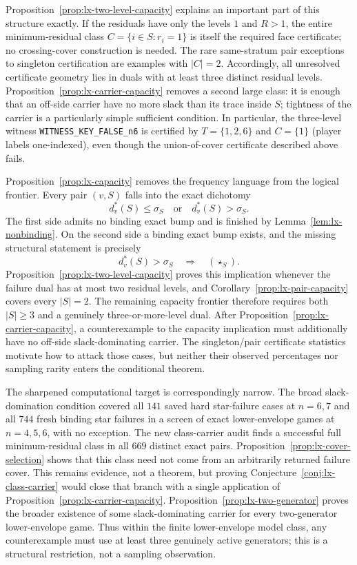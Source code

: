 Proposition~\ref{prop:lx-two-level-capacity} explains an important part of
this structure exactly.  If the residuals have only the levels $1$ and
$R>1$, the entire minimum-residual class
$C=\{i\in S:r_i=1\}$ is itself the required face certificate; no
crossing-cover construction is needed.  The rare same-stratum pair exceptions
to singleton certification are examples with $|C|=2$.  Accordingly, all
unresolved certificate geometry lies in duals with at least three distinct
residual levels.  Proposition~\ref{prop:lx-carrier-capacity} removes a second
large class: it is enough that an off-side carrier have no more slack than its
trace inside $S$; tightness of the carrier is a particularly simple sufficient
condition.  In particular, the
three-level witness \texttt{WITNESS\_KEY\_FALSE\_n6} is certified by
$T=\{1,2,6\}$ and $C=\{1\}$ (player labels one-indexed), even though the
union-of-cover certificate described above fails.

Proposition~\ref{prop:lx-capacity} removes the frequency language from the
logical frontier. Every pair $(v,S)$ falls into the exact dichotomy
\[
 d^*_v(S)\leq\sigma_S
 \quad\text{or}\quad
 d^*_v(S)>\sigma_S.
\]
The first side admits no binding exact bump and is finished by
Lemma~\ref{lem:lx-nonbinding}. On the second side a binding exact bump exists,
and the missing structural statement is precisely
\[
 d^*_v(S)>\sigma_S\quad\Longrightarrow\quad(\star_S).
\]
Proposition~\ref{prop:lx-two-level-capacity} proves this implication whenever
the failure dual has at most two residual levels, and
Corollary~\ref{prop:lx-pair-capacity} covers every $|S|=2$.  The remaining
capacity frontier therefore requires both $|S|\geq3$ and a genuinely
three-or-more-level dual.  After
Proposition~\ref{prop:lx-carrier-capacity}, a counterexample to the capacity
implication must additionally have no off-side slack-dominating carrier.  The
singleton/pair certificate statistics motivate how to attack those cases, but
neither their observed percentages nor sampling rarity enters the conditional
theorem.

The sharpened computational target is correspondingly narrow.  The broad
slack-domination condition covered all $141$ saved hard star-failure cases at
$n=6,7$ and all $744$ fresh binding star failures in a screen of exact
lower-envelope games at $n=4,5,6$, with no exception.  The new class-carrier
audit finds a successful full minimum-residual class in all $669$ distinct
exact pairs.  Proposition~\ref{prop:lx-cover-selection} shows that this class
need not come from an arbitrarily returned failure cover.  This remains
evidence, not a theorem, but proving
Conjecture~\ref{conj:lx-class-carrier} would close that branch with a single
application of Proposition~\ref{prop:lx-carrier-capacity}.
Proposition~\ref{prop:lx-two-generator} proves the broader existence of some
slack-dominating carrier for every two-generator lower-envelope game.  Thus
within the finite lower-envelope
model class, any counterexample must use at least three genuinely active
generators; this is a structural restriction, not a sampling observation.

